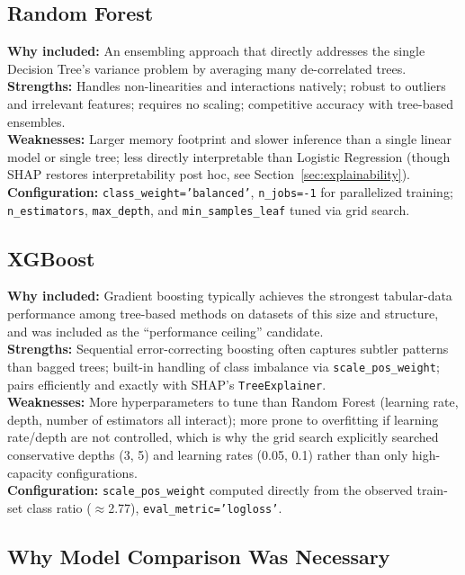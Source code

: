 \documentclass[11pt]{article}
\begin{document}
\subsection{Random Forest}
\textbf{Why included:} An ensembling approach that directly addresses the single Decision Tree's variance problem by averaging many de-correlated trees.\\
\textbf{Strengths:} Handles non-linearities and interactions natively; robust to outliers and irrelevant features; requires no scaling; competitive accuracy with tree-based ensembles.\\
\textbf{Weaknesses:} Larger memory footprint and slower inference than a single linear model or single tree; less directly interpretable than Logistic Regression (though SHAP restores interpretability post hoc, see Section~\ref{sec:explainability}).\\
\textbf{Configuration:} \texttt{class\_weight='balanced'}, \texttt{n\_jobs=-1} for parallelized training; \texttt{n\_estimators}, \texttt{max\_depth}, and \texttt{min\_samples\_leaf} tuned via grid search.

\subsection{XGBoost}
\textbf{Why included:} Gradient boosting typically achieves the strongest tabular-data performance among tree-based methods on datasets of this size and structure, and was included as the ``performance ceiling'' candidate.\\
\textbf{Strengths:} Sequential error-correcting boosting often captures subtler patterns than bagged trees; built-in handling of class imbalance via \texttt{scale\_pos\_weight}; pairs efficiently and exactly with SHAP's \texttt{TreeExplainer}.\\
\textbf{Weaknesses:} More hyperparameters to tune than Random Forest (learning rate, depth, number of estimators all interact); more prone to overfitting if learning rate/depth are not controlled, which is why the grid search explicitly searched conservative depths (3, 5) and learning rates (0.05, 0.1) rather than only high-capacity configurations.\\
\textbf{Configuration:} \texttt{scale\_pos\_weight} computed directly from the observed train-set class ratio ($\approx$2.77), \texttt{eval\_metric='logloss'}.

\subsection{Why Model Comparison Was Necessary}
\end{document}
